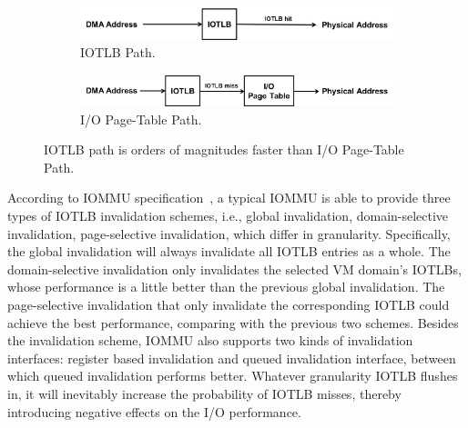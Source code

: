 \begin{figure}[!t]
    \begin{subfigure}{0.5\textwidth}
        \includegraphics[width=1\textwidth]{image/background/DMA-IOTLB-translation.png}
        \caption{\centering IOTLB Path.}
        \label{fig:subfig:a}
    \end{subfigure}%
    \vfill \vfill \vfill \vfill
    \begin{subfigure}{0.5\textwidth}
        \includegraphics[width=1\textwidth]{image/background/DMA-pt-translation.png}
        \caption{\centering I/O Page-Table Path.}
        \label{fig:subfig:b}
    \end{subfigure}
    \caption{IOTLB path is orders of magnitudes faster than I/O Page-Table Path.}
    \label{fig:dma-add-trans}
\end{figure}

According to IOMMU specification~\cite{intelvt}, a typical IOMMU is able to provide three types of IOTLB invalidation schemes, i.e., global invalidation, domain-selective invalidation, page-selective invalidation, which differ in granularity.
Specifically, the global invalidation will always invalidate all IOTLB entries as a whole.
The domain-selective invalidation only invalidates the selected VM domain's IOTLBs, whose performance is a little better than the previous global invalidation.
The page-selective invalidation that only invalidate the corresponding IOTLB could achieve the best performance, comparing with the previous two schemes.
Besides the invalidation scheme, IOMMU also supports two kinds of invalidation interfaces: register based invalidation and queued invalidation interface, between which queued invalidation performs better.
Whatever granularity IOTLB flushes in, it will inevitably increase the probability of IOTLB misses, thereby introducing negative effects on the I/O performance.
